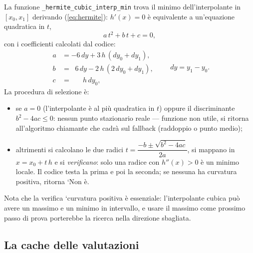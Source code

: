 La funzione \texttt{\_hermite\_cubic\_interp\_min} trova il minimo
dell'interpolante in $[x_0, x_1]$ derivando (\ref{eq:hermite}):
$h'(x) = 0$ è equivalente a un'equazione quadratica in $t$,
\begin{equation}
\label{eq:hermite-quadratic}
a\,t^2 + b\,t + c = 0,
\end{equation}
con i coefficienti calcolati dal codice:
\begin{equation}
\label{eq:hermite-coeffs}
\begin{aligned}
a &= -6\,dy + 3\,h\,(dy_0 + dy_1),\\
b &= \;\;6\,dy - 2\,h\,(2\,dy_0 + dy_1),\\
c &= \;\;\;\;\;\;h\,dy_0,
\end{aligned}
\qquad dy = y_1 - y_0.
\end{equation}
La procedura di selezione è:
\begin{itemize}
\item se $a = 0$ (l'interpolante è al più quadratica in $t$) oppure il
  discriminante $b^2 - 4ac \le 0$: nessun punto stazionario reale —
  funzione non utile, si ritorna all'algoritmo chiamante che cadrà sul
  fallback (raddoppio o punto medio);
\item altrimenti si calcolano le due radici
  $t = \dfrac{-b \pm \sqrt{b^2 - 4ac}}{2a}$, si mappano in
  $x = x_0 + t\,h$ e si \emph{verificano}: solo una radice con
  $h''(x) > 0$ è un minimo locale. Il codice testa la prima e poi la
  seconda; se nessuna ha curvatura positiva, ritorna `Non è.
\end{itemize}
Nota che la verifica `curvatura positiva è essenziale: l'interpolante
cubica può avere un massimo e un minimo in intervallo, e usare il massimo
come prossimo passo di prova porterebbe la ricerca nella direzione
sbagliata.

\subsection{La cache delle valutazioni}

